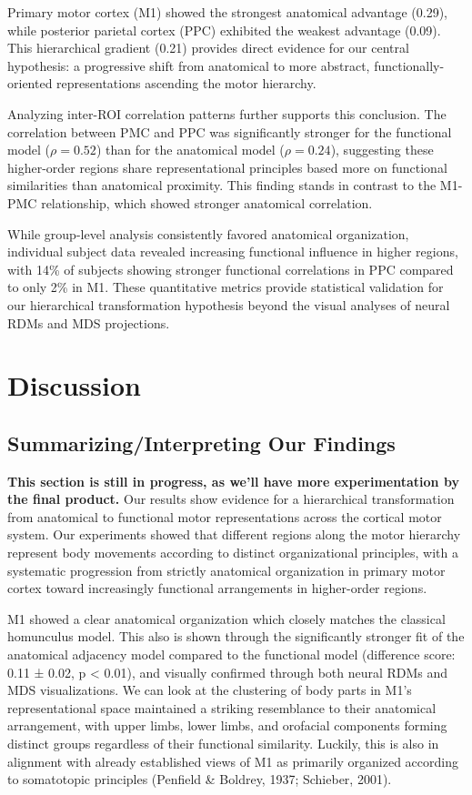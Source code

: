 \documentclass{article}
\begin{document}
Primary motor cortex (M1) showed the strongest anatomical advantage (0.29), while posterior parietal cortex (PPC) exhibited the weakest advantage (0.09). This hierarchical gradient (0.21) provides direct evidence for our central hypothesis: a progressive shift from anatomical to more abstract, functionally-oriented representations ascending the motor hierarchy.

Analyzing inter-ROI correlation patterns further supports this conclusion. The correlation between PMC and PPC was significantly stronger for the functional model ($\rho = 0.52$) than for the anatomical model ($\rho = 0.24$), suggesting these higher-order regions share representational principles based more on functional similarities than anatomical proximity. This finding stands in contrast to the M1-PMC relationship, which showed stronger anatomical correlation.

While group-level analysis consistently favored anatomical organization, individual subject data revealed increasing functional influence in higher regions, with 14\% of subjects showing stronger functional correlations in PPC compared to only 2\% in M1. These quantitative metrics provide statistical validation for our hierarchical transformation hypothesis beyond the visual analyses of neural RDMs and MDS projections.

\section{Discussion}

\subsection{Summarizing/Interpreting Our Findings}

\textbf{This section is still in progress, as we'll have more experimentation by the final product.} Our results show evidence for a hierarchical transformation from anatomical to functional motor representations across the cortical motor system. Our experiments showed that different regions along the motor hierarchy represent body movements according to distinct organizational principles, with a systematic progression from strictly anatomical organization in primary motor cortex toward increasingly functional arrangements in higher-order regions.

M1 showed a clear anatomical organization which closely matches the classical homunculus model. This also is shown through the significantly stronger fit of the anatomical adjacency model compared to the functional model (difference score: 0.11 ± 0.02, p < 0.01), and visually confirmed through both neural RDMs and MDS visualizations. We can look at the clustering of body parts in M1's representational space maintained a striking resemblance to their anatomical arrangement, with upper limbs, lower limbs, and orofacial components forming distinct groups regardless of their functional similarity. Luckily, this is also in alignment with already established views of M1 as primarily organized according to somatotopic principles (Penfield \& Boldrey, 1937; Schieber, 2001).
\end{document}
